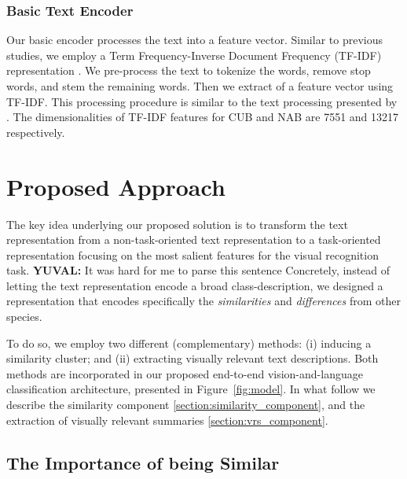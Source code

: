 \documentclass[11pt,a4paper]{article}
\newcommand\yuval[1]{\textcolor{darkpink}{\textbf{YUVAL:} #1 }}
\begin{document}
\subsubsection{Basic Text Encoder}
\label{section:Text_Encoder}
Our basic encoder processes the text into a feature vector. Similar to previous studies, we employ a Term Frequency-Inverse Document Frequency (TF-IDF)  representation \citep{salton1988term}. %
We pre-process the text to tokenize the words, remove stop words, and stem the remaining words. Then we extract of a feature vector using TF-IDF. This processing procedure is similar to the text processing presented by \citet{zhu2018generative}.
The dimensionalities of TF-IDF features for CUB and NAB are 7551 and 13217 respectively. 

\section{Proposed Approach}

The key idea underlying our proposed solution is to transform the text representation from a non-task-oriented text representation to a task-oriented representation focusing on the most salient features for the visual recognition task. \yuval{It was hard for me to parse this sentence}
Concretely, instead of letting the text representation encode a broad class-description, we designed a representation that encodes specifically the {\em similarities} and {\em differences} from other species. 

To do so, we employ two different (complementary) methods: (i)  inducing a similarity cluster; and (ii)  extracting visually relevant text descriptions. Both methods are incorporated in our proposed end-to-end vision-and-language classification architecture, presented in Figure~\ref{fig:model}. In what follow we describe the similarity component \ref{section:similarity_component}, and the extraction of visually relevant summaries \ref{section:vrs_component}.


\subsection{The Importance of being Similar}
\end{document}
